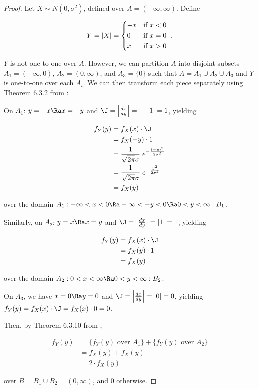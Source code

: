\begin{proof}
  Let $X \sim N(0, \sigma^2)$, defined over $A = (-\infty, \infty)$. Define 
  
  \begin{equation*}
    Y = |X| =
    \begin{dcases*}
      -x & if $x < 0$ \\
      0 & if $x = 0$ \\
      x & if $x > 0$ \\
    \end{dcases*}
    .
  \end{equation*}

  $Y$ is not one-to-one over $A$. However, we can partition $A$ into disjoint
  subsets $A_1 = (-\infty, 0)$, $A_2 = (0, \infty)$, and $A_3 = \{0\}$ such
  that $A = A_1 \cup A_2 \cup A_3$ and $Y$ is one-to-one over each $A_i$. We
  can then transform each piece separately using Theorem 6.3.2 from
  \citet{textbook}:

  On $A_1$: $y = -x \Ra x = -y$ and $\J = \left| \frac{dx}{dy} \right| = |-1|
  = 1$, yielding

  \begin{align*}
    f_Y(y) &= f_X(x) \cdot \J \\
    &= f_X(-y) \cdot 1 \\
    &= \frac{1}{\sqrt{2\pi}\sigma} \; e^{-\frac{(-y)^2}{2\sigma^2}} \\
    &= \frac{1}{\sqrt{2\pi}\sigma} \; e^{-\frac{y^2}{2\sigma^2}} \\
    &= f_X(y)
  \end{align*}

  over the domain $A_1: -\infty < x < 0 \Ra -\infty < -y < 0 \Ra 0 < y < \infty :B_1$.

  Similarly, on $A_2$: $y = x \Ra x = y$ and $\J = \left| \frac{dx}{dy}
  \right| = |1| = 1$, yielding

  \begin{align*}
    f_Y(y) &= f_X(x) \cdot \J \\
    &= f_X(y) \cdot 1 \\
    &= f_X(y)
  \end{align*}

  over the domain $A_2: 0 < x < \infty \Ra 0 < y < \infty :B_2$.

  On $A_3$, we have $x = 0 \Ra y = 0$ and $\J = \left| \frac{dx}{dy} \right| =
  |0| = 0$, yielding $f_Y(y) = f_X(x) \cdot \J = f_X(x) \cdot 0 = 0$.

  Then, by Theorem 6.3.10 from \citet{textbook},

  \begin{align*}
    f_Y(y) &= \{ f_Y(y) \textrm{ over } A_1 \} + \{ f_Y(y) \textrm{ over } A_2 \} \\
    &= f_X(y) + f_X(y) \\
    &= 2 \cdot f_X(y)
  \end{align*}

  over $B = B_1 \cup B_2 = (0, \infty)$, and 0 otherwise.
\end{proof}

